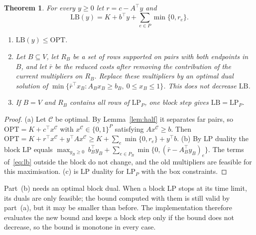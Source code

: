 \documentclass[11pt]{article}
\newtheorem{theorem}{Theorem}
\theoremstyle{definition}
\newcommand{\OPT}{\mathrm{OPT}}
\newcommand{\LB}{\mathrm{LB}}
\begin{document}
\begin{theorem}\label{thm:anytime}
For every $y\ge 0$ let $r=c-A^\top y$ and
\begin{equation}\label{eq:lb}
\LB(y)=K+b^\top y+\sum_{e\in P}\min\{0,r_e\}.
\end{equation}
\begin{enumerate}
\item[(a)] $\LB(y)\le\OPT$.
\item[(b)] Let $B\subseteq V$, let $R_B$ be a set of rows supported on pairs
with both endpoints in $B$, and let $\bar r$ be the reduced costs after
removing the contribution of the current multipliers on $R_B$.  Replace these
multipliers by an optimal dual solution of
$\min\{\bar r^\top x_B: A_Bx_B\ge b_B,\ 0\le x_B\le 1\}$.  This does not
decrease $\LB$.
\item[(c)] If $B=V$ and $R_B$ contains all rows of $\mathrm{LP}_P$, one block
step gives $\LB=\mathrm{LP}_P$.
\end{enumerate}
\end{theorem}
\begin{proof}
(a) Let $\mathcal C$ be optimal.  By Lemma~\ref{lem:half} it separates far
pairs, so $\OPT=K+c^\top x^{\mathcal C}$ with $x^{\mathcal C}\in\{0,1\}^P$
satisfying $Ax^{\mathcal C}\ge b$.  Then
$\OPT=K+r^\top x^{\mathcal C}+y^\top Ax^{\mathcal C}\ge K+\sum_e\min\{0,r_e\}+y^\top b$.
(b) By LP duality the block LP equals
$\max_{y_B\ge0}\ b_B^\top y_B+\sum_{e\in P_B}\min\{0,(\bar r-A_B^\top
y_B)_e\}$.  The terms of~\eqref{eq:lb} outside the block do not change, and
the old multipliers are feasible for this maximisation.  (c) is LP duality
for $\mathrm{LP}_P$ with the box constraints.
\end{proof}

Part~(b) needs an optimal block dual.  When a block LP stops at its time limit,
its duals are only feasible; the bound computed with them is still valid by
part~(a), but it may be smaller than before.  The implementation therefore
evaluates the new bound and keeps a block step only if the bound does not
decrease, so the bound is monotone in every case.
\end{document}
